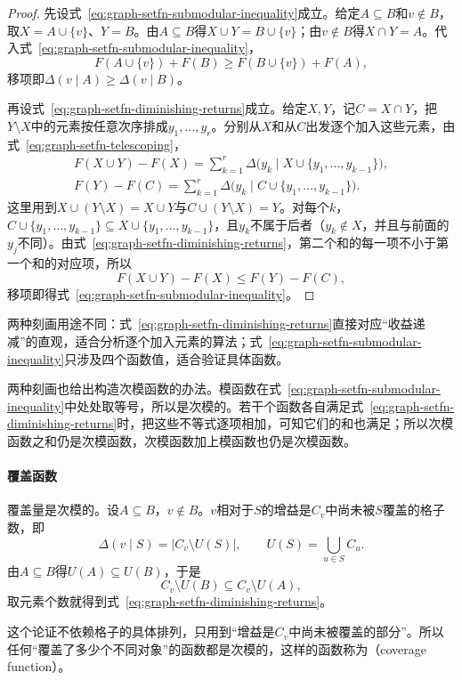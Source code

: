 \begin{proof}
先设式~\eqref{eq:graph-setfn-submodular-inequality}成立。给定$A\subseteq B$和$v\notin B$，取$X=A\cup\{v\}$、$Y=B$。由$A\subseteq B$得$X\cup Y=B\cup\{v\}$；由$v\notin B$得$X\cap Y=A$。代入式~\eqref{eq:graph-setfn-submodular-inequality}，
\[
  F(A\cup\{v\})+F(B)\geq F(B\cup\{v\})+F(A),
\]
移项即$\Delta(v\mid A)\geq\Delta(v\mid B)$。

再设式~\eqref{eq:graph-setfn-diminishing-returns}成立。给定$X,Y$，记$C=X\cap Y$，把$Y\setminus X$中的元素按任意次序排成$y_1,\ldots,y_r$。分别从$X$和从$C$出发逐个加入这些元素，由式~\eqref{eq:graph-setfn-telescoping}，
\[
  \begin{gathered}
  F(X\cup Y)-F(X)=\sum_{k=1}^{r}\Delta\bigl(y_k\mid X\cup\{y_1,\ldots,y_{k-1}\}\bigr),\\
  F(Y)-F(C)=\sum_{k=1}^{r}\Delta\bigl(y_k\mid C\cup\{y_1,\ldots,y_{k-1}\}\bigr).
  \end{gathered}
\]
这里用到$X\cup(Y\setminus X)=X\cup Y$与$C\cup(Y\setminus X)=Y$。对每个$k$，$C\cup\{y_1,\ldots,y_{k-1}\}\subseteq X\cup\{y_1,\ldots,y_{k-1}\}$，且$y_k$不属于后者（$y_k\notin X$，并且与前面的$y_j$不同）。由式~\eqref{eq:graph-setfn-diminishing-returns}，第二个和的每一项不小于第一个和的对应项，所以
\[
  F(X\cup Y)-F(X)\leq F(Y)-F(C),
\]
移项即得式~\eqref{eq:graph-setfn-submodular-inequality}。
\end{proof}

两种刻画用途不同：式~\eqref{eq:graph-setfn-diminishing-returns}直接对应“收益递减”的直观，适合分析逐个加入元素的算法；式~\eqref{eq:graph-setfn-submodular-inequality}只涉及四个函数值，适合验证具体函数。

两种刻画也给出构造次模函数的办法。模函数在式~\eqref{eq:graph-setfn-submodular-inequality}中处处取等号，所以是次模的。若干个函数各自满足式~\eqref{eq:graph-setfn-diminishing-returns}时，把这些不等式逐项相加，可知它们的和也满足；所以次模函数之和仍是次模函数，次模函数加上模函数也仍是次模函数。

\paragraph{覆盖函数}
覆盖量是次模的。设$A\subseteq B$，$v\notin B$。$v$相对于$S$的增益是$C_v$中尚未被$S$覆盖的格子数，即
\[
  \Delta(v\mid S)=|C_v\setminus U(S)|,\qquad U(S)=\bigcup_{u\in S}C_u.
\]
由$A\subseteq B$得$U(A)\subseteq U(B)$，于是
\[
  C_v\setminus U(B)\subseteq C_v\setminus U(A),
\]
取元素个数就得到式~\eqref{eq:graph-setfn-diminishing-returns}。

这个论证不依赖格子的具体排列，只用到“增益是$C_v$中尚未被覆盖的部分”。所以任何“覆盖了多少个不同对象”的函数都是次模的，这样的函数称为（coverage function）。

